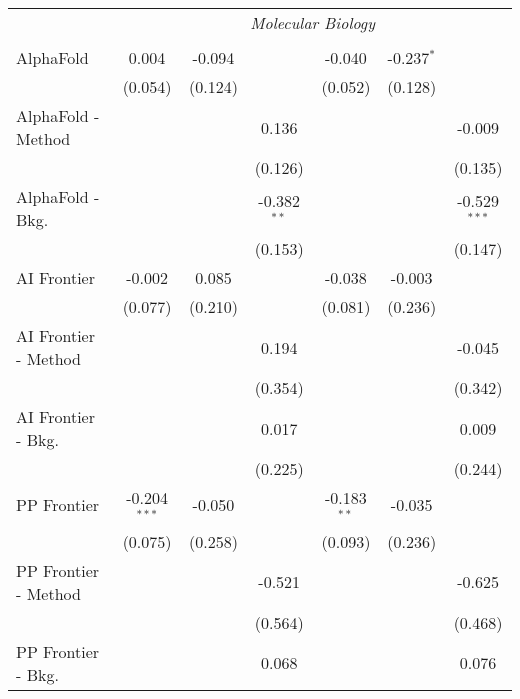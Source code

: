 \begin{tabular}{lcccccc}
 & \multicolumn{6}{c}{\textit{Molecular Biology}} \\ \\
   AlphaFold            & 0.004          & -0.094  &               & -0.040        & -0.237$^{*}$ &   \\   
                        & (0.054)        & (0.124) &               & (0.052)       & (0.128)      &   \\   
   AlphaFold - Method   &                &         & 0.136         &               &              & -0.009\\   
                        &                &         & (0.126)       &               &              & (0.135)\\   
   AlphaFold - Bkg.     &                &         & -0.382$^{**}$ &               &              & -0.529$^{***}$\\   
                        &                &         & (0.153)       &               &              & (0.147)\\   
   AI Frontier          & -0.002         & 0.085   &               & -0.038        & -0.003       &   \\   
                        & (0.077)        & (0.210) &               & (0.081)       & (0.236)      &   \\   
   AI Frontier - Method &                &         & 0.194         &               &              & -0.045\\   
                        &                &         & (0.354)       &               &              & (0.342)\\   
   AI Frontier - Bkg.   &                &         & 0.017         &               &              & 0.009\\   
                        &                &         & (0.225)       &               &              & (0.244)\\   
   PP Frontier          & -0.204$^{***}$ & -0.050  &               & -0.183$^{**}$ & -0.035       &   \\   
                        & (0.075)        & (0.258) &               & (0.093)       & (0.236)      &   \\   
   PP Frontier - Method &                &         & -0.521        &               &              & -0.625\\   
                        &                &         & (0.564)       &               &              & (0.468)\\   
   PP Frontier - Bkg.   &                &         & 0.068         &               &              & 0.076\\   

\end{tabular}

